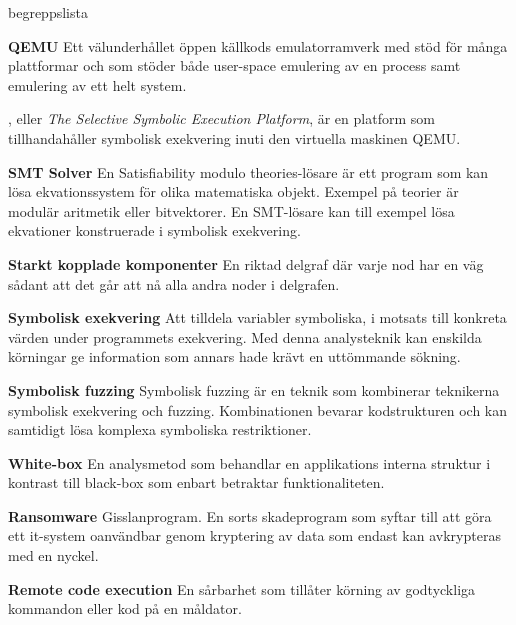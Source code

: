 \begin{labeling}{begreppslista}
    \item [\textbf{QEMU}] Ett välunderhållet öppen källkods emulatorramverk med stöd
    för många plattformar och som stöder både user-space emulering av en process
    samt emulering av ett helt system.

    \item [\textbf{\stoe}] \stoe, eller \emph{The Selective Symbolic Execution Platform}, är
    en platform som tillhandahåller symbolisk exekvering inuti den virtuella
    maskinen QEMU.\@

    \item [\textbf{SMT Solver}] En Satisfiability modulo theories-lösare är ett
    program som kan lösa ekvationssystem för olika matematiska objekt. Exempel
    på teorier är modulär aritmetik eller bitvektorer. En SMT-lösare kan till
    exempel lösa ekvationer konstruerade i symbolisk exekvering.

    \item [\textbf{Starkt kopplade komponenter}] En riktad delgraf där
    varje nod har en väg sådant att det går att nå alla andra noder i delgrafen.

    \item [\textbf{Symbolisk exekvering}] Att tilldela variabler symboliska, i
    motsats till konkreta värden under programmets exekvering. Med denna
    analysteknik kan enskilda körningar ge information som annars hade krävt
    en uttömmande sökning.

    \item [\textbf{Symbolisk fuzzing}] Symbolisk fuzzing är en teknik som
    kombinerar teknikerna symbolisk exekvering och fuzzing. Kombinationen
    bevarar kodstrukturen och kan samtidigt lösa komplexa symboliska
    restriktioner.

    \item [\textbf{White-box}] En analysmetod som behandlar en applikations
    interna struktur i kontrast till black-box som enbart betraktar
    funktionaliteten.

    \item [\textbf{Ransomware}] Gisslanprogram. En sorts skadeprogram som syftar
    till att göra ett it-system oanvändbar genom kryptering av data som
    endast kan avkrypteras med en nyckel.

    \item [\textbf{Remote code execution}] En sårbarhet som tillåter körning av
    godtyckliga kommandon eller kod på en måldator.
\end{labeling}

